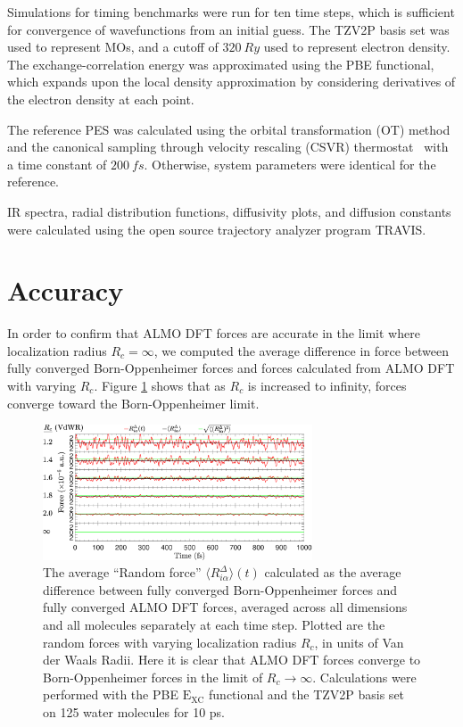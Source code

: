 \documentclass[10pt,aps,prl,twocolumn,amsmath,amssymb,superscriptaddress,longbibliography]{revtex4-1}
\begin{document}
Simulations for timing benchmarks were run for ten time steps, which is sufficient for convergence of wavefunctions from an initial guess.
The TZV2P basis set was used to represent MOs, and a cutoff of $\SI{320}{Ry}$ used to represent electron density. 
The exchange-correlation energy was approximated using the PBE functional, which expands upon the local density approximation by considering derivatives of the electron density at each point.~\cite{a:PBEfunctional} 

The reference PES was calculated using the orbital transformation (OT) method~\cite{a:ot,a:ot2} and the canonical sampling through velocity rescaling (CSVR) thermostat~\cite{a:CSVR} with a time constant of $\SI{200}{fs}$. 
Otherwise, system parameters were identical for the reference.

IR spectra, radial distribution functions, diffusivity plots, and diffusion constants were calculated using the open source trajectory analyzer program TRAVIS.~\cite{a:travis-main,a:travis-ir1,a:travis-ir2}

\section{Accuracy}

In order to confirm that ALMO DFT forces are accurate in the limit where localization radius $R_{c} = \infty$, we computed the average difference in force between fully converged Born-Oppenheimer forces and forces calculated from ALMO DFT with varying $R_{c}$. Figure \ref{fig:forcecomp} shows that as $R_{c}$ is increased to infinity, forces converge toward the Born-Oppenheimer limit.

\begin{figure}
\includegraphics[trim={0.1cm 0cm 0cm 0cm},clip,width=8cm]{DeltaForceComparison_ALMO_SCF.eps}
\caption{\label{fig:forcecomp}The average ``Random force'' $\langle R^{\Delta}_{i\alpha} \rangle (t)$ calculated as the average difference between fully converged Born-Oppenheimer forces and fully converged ALMO DFT forces, averaged across all dimensions and all molecules separately at each time step. 
Plotted are the random forces with varying localization radius $R_{c}$, in units of Van der Waals Radii.
Here it is clear that ALMO DFT forces converge to Born-Oppenheimer forces in the limit of $R_{c} \rightarrow \infty$.
Calculations were performed with the PBE $\mathrm{E_{XC}}$ functional and the TZV2P basis set on 125 water molecules for 10 ps.}
\end{figure}
\end{document}
